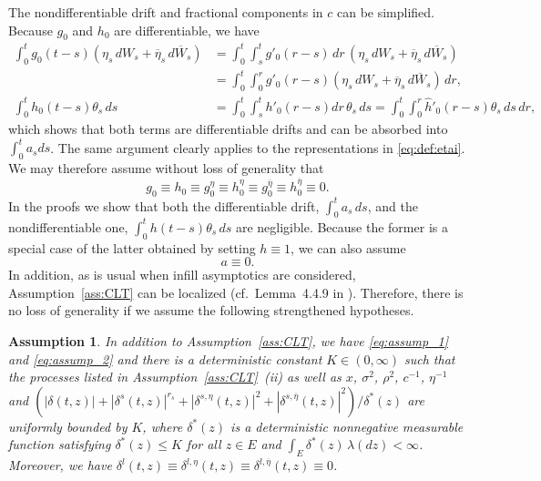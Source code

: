 \documentclass[ecta,nameyear,draft]{econsocart}
\makeatletter
\newtheorem{Assumption}{Assumption}
\renewcommand{\theAssumption}{\Alph{Assumption}}
\newcommand{\settheoremtag}[1]{%
	\let\oldtheAssumption\theAssumption%
	\renewcommand{\theAssumption}{#1}%
	\g@addto@macro\endAssumption{%
		\global\let\theAssumption\oldtheAssumption}%
}
\def\wh{\widehat}
\newcommand{\1}{\mathbf 1}
\newcommand{\jump}{\delta}
\numberwithin{equation}{section}
\newcommand{\la}{{\lambda}}
\newcommand{\si}{{\sigma}}
\newcommand{\ov}{\overline}
\makeatother
\begin{document}
\begin{appendix}
The nondifferentiable drift and fractional components in $c$ can be simplified. Because $g_0$ and $h_0$ are differentiable, we have
\begin{align*}
	\int_0^t g_0(t-s)(\eta_s\,dW_s+\ov \eta_s\, d\ov W_s)&= \int_0^t\int_s^t g'_0(r-s)\,dr \, (\eta_s\,dW_s+\ov \eta_s\, d\ov W_s)\\
	&= \int_0^t \int_0^r g'_0(r-s)(\eta_s\,dW_s+\ov \eta_s\, d\ov W_s)\,dr,
	\\
	\int_0^t   h_0(t-s)\theta_s \, ds&= \int_0^t \int_s^t  h'_0(r-s)dr \, \theta_s \,ds = \int_0^t\int_0^r\wh h'_0(r-s)\theta_s \,ds \,dr,
\end{align*}
which shows that both terms are differentiable drifts and can be absorbed into $\int_0^t a_s ds$. The same argument clearly applies to the representations in \eqref{eq:def:etai}. We may therefore assume without loss of generality that 
\begin{equation}\label{eq:assump_1} 
	g_0\equiv h_0 \equiv g^\eta_0\equiv h^\eta_0 \equiv g^{\ov \eta}_0\equiv h^{\ov \eta}_0\equiv 0.
\end{equation}
In the proofs we show that both the differentiable drift, $\int_0^t a_s\, ds$, and the nondifferentiable one, $\int_0^t h(t-s)\theta_s\, ds$ are negligible. Because the former is a special case of the latter obtained by setting $h\equiv 1$, we can also assume
\begin{equation}\label{eq:assump_2} 
	a\equiv0.
\end{equation}
In addition, as is usual when infill asymptotics are considered, Assumption~\ref{ass:CLT} can be localized (cf.\  Lemma~4.4.9 in \cite{JP}). Therefore, there is no loss of generality if we assume the following strengthened hypotheses.
\settheoremtag{CLT'}
\begin{Assumption}\label{ass:CLT'}
	In addition to Assumption~\ref{ass:CLT}, we have \eqref{eq:assump_1} and \eqref{eq:assump_2} and there is a deterministic constant $K\in(0,\infty)$ such that the processes listed in Assumption~\ref{ass:CLT}~(ii) as well as $x$, $\si^2$, $\rho^2$, $c^{-1}$, $\eta^{-1}$ and 	$(|\jump(t,z)| + |\jump^{s}(t,z)|^{r_s} +  |\jump^{s,\eta}(t,z)|^2   + |\jump^{s,\ov\eta}(t,z)|^2  ) /\delta^\ast(z)$ are uniformly bounded by $K$, where $\delta^\ast(z)$ is a deterministic nonnegative measurable function  satisfying $\delta^\ast(z)\leq K$ for all $z\in E$ and $\int_E \delta^\ast(z) \,\la(dz)<\infty$. Moreover,   we have $\jump^{l}(t,z)\equiv \jump^{l,\eta}(t,z)\equiv\jump^{l,\ov\eta}(t,z)\equiv0$.

\end{Assumption}
\end{appendix}
\end{document}
